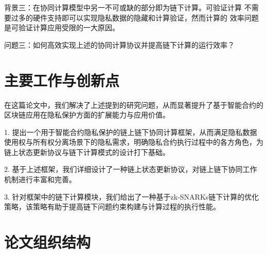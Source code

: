 背景三：在协同计算模型中另一不可或缺的部分即为链下计算。可验证计算
不需要过多的硬件支持即可以实现隐私数据的隐藏和计算验证，然而计算的
效率问题是可验证计算应用受限的一大原因。

问题三：如何高效实现上述的协同计算协议并提高链下计算的运行效率？

\section{主要工作与创新点}

在这篇论文中，我们解决了上述提到的研究问题，从而显著提升了基于智能合约的区块链应用在隐私保护方面的扩展能力与应用价值。

1. 提出一个用于智能合约隐私保护的链上链下协同计算框架，从而满足隐私数据使用权与所有权分离场景下的隐私需求，明确隐私合约执行过程中的各方角色，为链上状态更新协议与链下计算模式的设计打下基础。

2. 基于上述框架，我们详细设计了一种链上状态更新协议，对链上链下协同工作机制进行丰富和完善。

3. 针对框架中的链下计算模块，我们给出了一种基于zk-SNARKs链下计算的优化策略，该策略有助于提高链下问题约束构建与计算过程的执行性能。

\section{论文组织结构}

